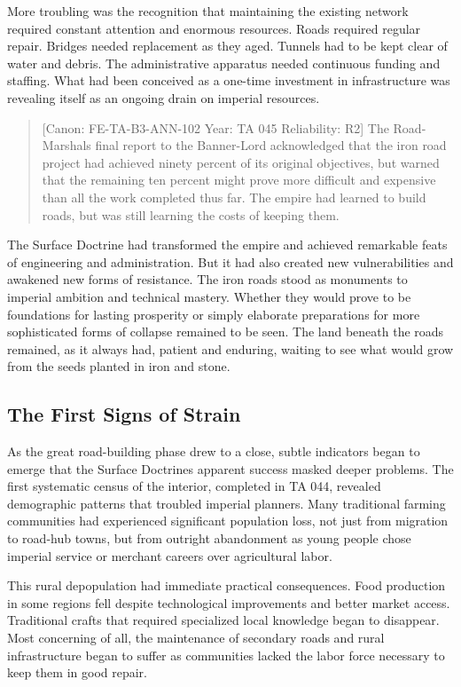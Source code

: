 More troubling was the recognition that maintaining the existing network
required constant attention and enormous resources. Roads required
regular repair. Bridges needed replacement as they aged. Tunnels had to
be kept clear of water and debris. The administrative apparatus needed
continuous funding and staffing. What had been conceived as a one-time
investment in infrastructure was revealing itself as an ongoing drain on
imperial resources.

\begin{quote}
{[}Canon: FE-TA-B3-ANN-102 \textbar{} Year: TA 045 \textbar{}
Reliability: R2{]} The Road-Marshal\textquotesingle s final report to
the Banner-Lord acknowledged that the iron road project had achieved
ninety percent of its original objectives, but warned that the remaining
ten percent might prove more difficult and expensive than all the work
completed thus far. The empire had learned to build roads, but was still
learning the costs of keeping them.
\end{quote}

The Surface Doctrine had transformed the empire and achieved remarkable
feats of engineering and administration. But it had also created new
vulnerabilities and awakened new forms of resistance. The iron roads
stood as monuments to imperial ambition and technical mastery. Whether
they would prove to be foundations for lasting prosperity or simply
elaborate preparations for more sophisticated forms of collapse remained
to be seen. The land beneath the roads remained, as it always had,
patient and enduring, waiting to see what would grow from the seeds
planted in iron and stone.

\subsection{The First Signs of Strain}\label{the-first-signs-of-strain}

As the great road-building phase drew to a close, subtle indicators
began to emerge that the Surface Doctrine\textquotesingle s apparent
success masked deeper problems. The first systematic census of the
interior, completed in TA 044, revealed demographic patterns that
troubled imperial planners. Many traditional farming communities had
experienced significant population loss, not just from migration to
road-hub towns, but from outright abandonment as young people chose
imperial service or merchant careers over agricultural labor.

This rural depopulation had immediate practical consequences. Food
production in some regions fell despite technological improvements and
better market access. Traditional crafts that required specialized local
knowledge began to disappear. Most concerning of all, the maintenance of
secondary roads and rural infrastructure began to suffer as communities
lacked the labor force necessary to keep them in good repair.

